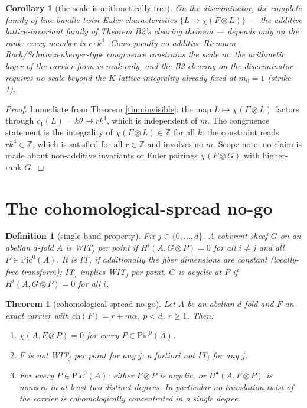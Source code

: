 \documentclass[11pt]{article}
\newtheorem{theorem}{Theorem}
\newtheorem{corollary}{Corollary}
\newtheorem{definition}{Definition}
\begin{document}
\begin{corollary}[the scale is arithmetically free]\label{cor:mfree}
On the discriminator, the complete family of line-bundle-twist Euler characteristics
$\{L\mapsto\chi(F\otimes L)\}$ --- the additive lattice-invariant family of Theorem B2's clearing
theorem --- depends only on the rank: every member is $r\cdot k^4$. Consequently no additive
Riemann--Roch/Schwarzenberger-type congruence constrains the scale $m$: the arithmetic layer of the
carrier form is rank-only, and the B2 clearing on the discriminator requires no scale beyond the
$K$-lattice integrality already fixed at $m_0=1$ (strike 1).
\end{corollary}

\begin{proof}
Immediate from Theorem \ref{thm:invisible}: the map $L\mapsto\chi(F\otimes L)$ factors through
$c_1(L)=k\theta\mapsto rk^4$, which is independent of $m$. The congruence statement is the integrality of
$\chi(F\otimes L)\in\mathbb{Z}$ for all $k$: the constraint reads $rk^4\in\mathbb{Z}$, which is
satisfied for all $r\in\mathbb{Z}$ and involves no $m$. Scope note: no claim is made about non-additive
invariants or Euler pairings $\chi(F\otimes G)$ with higher-rank $G$.
\end{proof}

\section{The cohomological-spread no-go}\label{sec:spread}

\begin{definition}[single-band property]
Fix $j\in\{0,\dots,d\}$. A coherent sheaf $G$ on an abelian $d$-fold $A$ is \emph{WIT$_j$ per point} if
$H^i(A,G\otimes P)=0$ for all $i\ne j$ and \emph{all} $P\in\mathrm{Pic}^0(A)$. It is \emph{IT$_j$} if
additionally the fiber dimensions are constant (locally-free transform); IT$_j$ implies WIT$_j$ per
point. $G$ is \emph{acyclic at $P$} if $H^i(A,G\otimes P)=0$ for all $i$.
\end{definition}

\begin{theorem}[cohomological-spread no-go]\label{thm:spread}
Let $A$ be an abelian $d$-fold and $F$ an exact carrier with $\mathrm{ch}(F)=r+m\alpha$, $p<d$,
$r\ge1$. Then:
\begin{enumerate}[itemsep=1pt,label=(\roman*)]
\item $\chi(A,F\otimes P)=0$ for every $P\in\mathrm{Pic}^0(A)$.
\item $F$ is not WIT$_j$ per point for any $j$; a fortiori not IT$_j$ for any $j$.
\item For every $P\in\mathrm{Pic}^0(A)$: either $F\otimes P$ is acyclic, or $H^\bullet(A,F\otimes P)$
is nonzero in at least two distinct degrees. In particular no translation-twist of the carrier is
cohomologically concentrated in a single degree.
\end{enumerate}
\end{theorem}
\end{document}
